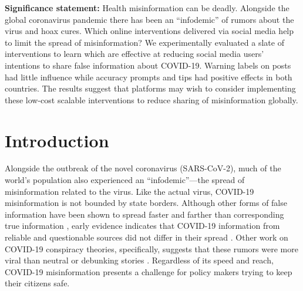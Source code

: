 \documentclass[letterpaper, 12pt, parskip=full,DIV=10]{scrartcl}
\begin{document}
\textbf{Significance statement:}
Health misinformation can be deadly. Alongside the global coronavirus pandemic there has been an ``infodemic'' of rumors about the virus and hoax cures.  Which online interventions delivered via social media help to limit the spread of misinformation? We experimentally evaluated a slate of interventions to learn which are effective at reducing social media users' intentions to share false information about COVID-19. Warning labels on posts had little influence while accuracy prompts and tips had positive effects in both countries. The results suggest that platforms may wish to consider implementing these low-cost scalable interventions to reduce sharing of misinformation globally. 


\clearpage


\section{Introduction}

Alongside the outbreak of the novel coronavirus (SARS-CoV-2), much of the world's population also experienced an ``infodemic''---the spread of misinformation related to the virus. Like the actual virus, COVID-19 misinformation is not bounded by state borders. Although other forms of false information have been shown to spread faster and farther than corresponding true information \citep{vosoughi2018spread}, early evidence indicates that COVID-19 information from reliable and questionable sources did not differ in their spread \citep{cinelli2020covid}.  Other work on COVID-19 conspiracy theories, specifically, suggests that these rumors were more viral than neutral or debunking stories \citep{HKS_whatsapp}.  %
Regardless of its speed and reach, COVID-19 misinformation presents a challenge for policy makers trying to keep their citizens safe.  %
\end{document}
